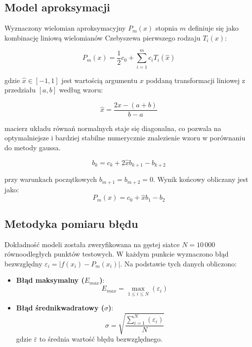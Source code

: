 \documentclass[twoside]{article}
\begin{document}
\subsection{Model aproksymacji}
Wyznaczony wielomian aproksymacyjny $P_m(x)$ stopnia $m$ definiuje się jako kombinację liniową wielomianów Czebyszewa pierwszego rodzaju $T_i(x)$:

\begin{equation}
P_m(x) = \frac{1}{2}c_0 + \sum_{i=1}^{m} c_i T_i(\hat{x})
\end{equation}

gdzie $\hat{x} \in [-1, 1]$ jest wartością argumentu $x$ poddaną transformacji liniowej z przedziału $[a, b]$ według wzoru:

\begin{equation}
\hat{x} = \frac{2x - (a+b)}{b-a}
\end{equation}


macierz układu równań normalnych staje się diagonalna, co pozwala na optymalniejsze i bardziej stabilne numerycznie znalezienie
wzoru w porównaniu do metody gaussa.

\begin{equation}
b_k = c_k + 2\hat{x}b_{k+1} - b_{k+2}
\end{equation}

przy warunkach początkowych $b_{m+1} = b_{m+2} = 0$. Wynik końcowy obliczany jest jako:
\begin{equation}
P_m(x) = c_0 + \hat{x}b_1 - b_2
\end{equation}

\subsection{Metodyka pomiaru błędu}
Dokładność modeli została zweryfikowana na gęstej siatce $N = 10\,000$ równoodległych punktów testowych. W każdym punkcie wyznaczono błąd bezwzględny $\varepsilon_i = |f(x_i) - P_m(x_i)|$. Na podstawie tych danych obliczono:

\begin{itemize}
    \item \textbf{Błąd maksymalny ($E_{max}$)}:
    \begin{equation}
    E_{max} = \max_{1 \le i \le N} (\varepsilon_i)
    \end{equation}
    
    \item \textbf{Błąd średnikwadratowy ($\sigma$)}:
    \begin{equation}
    \sigma = \sqrt{\frac{\sum_{i=1}^{N}(\varepsilon_{i})}{N}}
    \end{equation}
    gdzie $\bar{\varepsilon}$ to średnia wartość błędu bezwzględnego.
\end{itemize}
\end{document}

